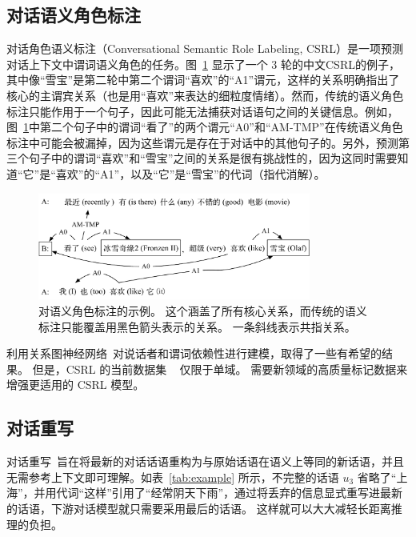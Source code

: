\subsection{对话语义角色标注} 对话角色语义标注（Conversational Semantic Role Labeling, CSRL）是一项预测对话上下文中谓词语义角色的任务。图~\ref{fig:csrl} 显示了一个 3 轮的中文CSRL的例子，其中像“雪宝”是第二轮中第二个谓词“喜欢”的“A1”谓元，这样的关系明确指出了核心的主谓宾关系（也是用“喜欢”来表达的细粒度情绪）。然而，传统的语义角色标注只能作用于一个句子，因此可能无法捕获对话语句之间的关键信息。例如，图~\ref{fig:csrl}中第二个句子中的谓词“看了”的两个谓元“A0”和“AM-TMP”在传统语义角色标注中可能会被漏掉，因为这些谓元是存在于对话中的其他句子的。另外，预测第三个句子中的谓词“喜欢”和“雪宝”之间的关系是很有挑战性的，因为这同时需要知道“它”是“喜欢”的“A1”，以及“它”是“雪宝”的代词（指代消解）。
\begin{figure}[!ht]
\centering
\includegraphics[width=0.8\textwidth]{pics/intro_v2.pdf}
\caption{对语义角色标注的示例。 这个涵盖了所有核心关系，而传统的语义标注只能覆盖用黑色箭头表示的关系。 一条斜线表示共指关系。}\label{fig:csrl}
\end{figure}

\citet{wu2021csagn} 利用关系图神经网络~\cite{schlichtkrull2018modeling}对说话者和谓词依赖性进行建模，取得了一些有希望的结果。 但是，CSRL 的当前数据集 ~\cite{xu2021conversational} 仅限于单域。 需要新领域的高质量标记数据来增强更适用的 CSRL 模型。


\subsection{对话重写} 对话重写~\cite{su-etal-2019-improving,pan-etal-2019-improving,elgohary2019can}旨在将最新的对话话语重构为与原始话语在语义上等同的新话语，并且无需参考上下文即可理解。如表~\ref{tab:example} 所示，不完整的话语 $u_3$ 省略了“上海”，并用代词“这样”引用了“经常阴天下雨”，通过将丢弃的信息显式重写进最新的话语，下游对话模型就只需要采用最后的话语。 这样就可以大大减轻长距离推理的负担。

